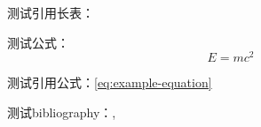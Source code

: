 测试引用长表：


测试公式：
\begin{equation}
  \label{eq:example-equation}
  E = mc^2
\end{equation}

测试引用公式：\eqref{eq:example-equation}


测试bibliography：\cite{zhang2023effects},\cite{author2023example}